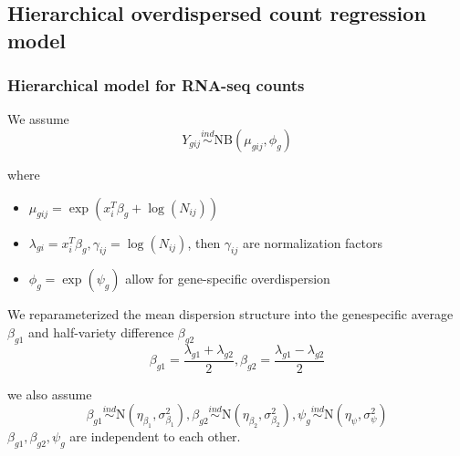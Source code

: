\documentclass[handout,10pt]{beamer}
\newcommand{\ind}{\stackrel{ind}{\sim}}
\begin{document}
\subsection{Hierarchical overdispersed count regression model}

\begin{frame}
\frametitle{Hierarchical model for RNA-seq counts}

We assume 
\[ 
Y_{gij} \ind \text{NB} \left (\mu_{gij}, \phi_g \right )
\]

where 
\begin{itemize}[<+->]
\item $\mu_{gij} = \exp(x_i^T\beta_g + \log(N_{ij}))$
\item $\lambda_{gi} = x_i^T\beta_g, \gamma_{ij} = \log(N_{ij})$, then $\gamma_{ij}$ are normalization factors
\item $\phi_{g} = \exp(\psi_g)$ allow for gene-specific overdispersion
\end{itemize}

We reparameterized the mean dispersion structure into the genespecific average $\beta_{g1}$ and half-variety difference $\beta_{g2}$ 
\begin{equation} 
\beta_{g1} = \frac{\lambda_{g1}+\lambda_{g2}}{2}, \beta_{g2} = \frac{\lambda_{g1}-\lambda_{g2}}{2}
\end{equation}

we also assume 
\begin{equation} 
\beta_{g1}  \ind \text{N} \left ( \eta_{\beta_{1}}, \sigma^2_{\beta_1} \right ), 
\beta_{g2} \ind \text{N} \left ( \eta_{\beta_2}, \sigma^2_{\beta_2} \right ),
\psi_g \ind \text{N} \left (\eta_{\psi} , \sigma^2_{\psi}  \right )
\end{equation}
$\beta_{g1}, \beta_{g2}, \psi_g$ are independent to each other.

\end{frame}
\end{document}
